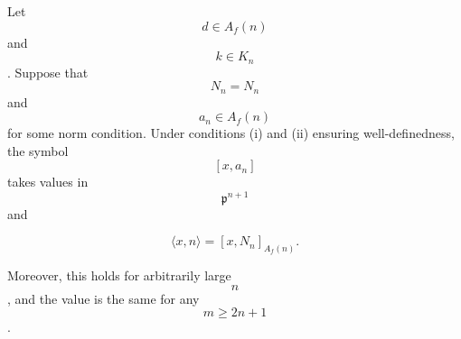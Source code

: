 Let $$d \in A_f(n)$$ and $$k \in K_n$$. Suppose that $$N_n = N_n$$ and $$a_n \in A_f(n)$$ for some norm condition. Under conditions (i) and (ii) ensuring well-definedness, the symbol $$[x, a_n]$$ takes values in $$\mathfrak{p}^{n+1}$$ and

$$\langle x, n \rangle = \left[ x, N_n \right]_{A_f(n)}.$$

Moreover, this holds for arbitrarily large $$n$$, and the value is the same for any $$m \geq 2n + 1$$.
